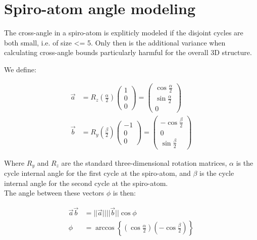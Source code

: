 \documentclass[a4paper]{article}
\begin{document}
\small

\newcommand{\posVecDiff}[2]{
  \left( \vec{r}_{#1} - \vec{r}_{#2} \right)
}

\newcommand{\vecDiff}[2]{
  \left( \vec{#1} - \vec{#2}\,\right)
}

\newcommand{\vecCross}[2]{
  \left( \vec{#1} \times \vec{#2}\,\right)
}

\newcommand{\posDependence}{
  \left( \left\{\vec{r}_i \right\} \right)
}

\newcommand{\distanceErrorFirstTermPart}{
  \frac{
    \posVecDiff{j}{i}^{2}
  }{
    U_{ij}^{2}
  } - 1
}

\section{Spiro-atom angle modeling}

The cross-angle in a spiro-atom is expliticly modeled if the disjoint cycles are
both small, i.e. of size <= 5. Only then is the additional variance when
calculating cross-angle bounds particularly harmful for the overall 3D
structure.

We define:

\begin{align}
  \vec{a} &= R_z\left(\frac{\alpha}{2}\right)\begin{pmatrix}
    1\\
    0\\
    0
  \end{pmatrix} = \begin{pmatrix}
    \cos \frac{\alpha}{2}\\
    \sin \frac{\alpha}{2}\\
    0
  \end{pmatrix}\\
  \vec{b} &= R_y\left(\frac{\beta}{2}\right)\begin{pmatrix}
    -1\\
    0\\
    0
  \end{pmatrix} = \begin{pmatrix}
    - \cos \frac{\beta}{2}\\
    0\\
    \sin \frac{\beta}{2}
  \end{pmatrix}
\end{align}

Where $R_y$ and $R_z$ are the standard three-dimensional rotation matrices,
$\alpha$ is the cycle internal angle for the first cycle at the spiro-atom, and
$\beta$ is the cycle internal angle for the second cycle at the spiro-atom.\\

The angle between these vectors $\phi$ is then:

\begin{align}
  \vec{a}\vec{b} &= ||\vec{a}||||\vec{b}|| \cos \phi\\
  \phi &= \arccos \left\{ 
    \left(\cos \frac{\alpha}{2} \right)
    \left(- \cos \frac{\beta}{2} \right)
  \right\}
\end{align}
\end{document}
